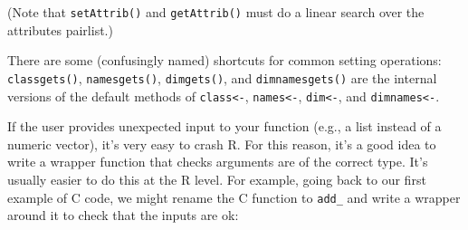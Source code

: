 \begin{Shaded}
\begin{Highlighting}[]
\StringTok{ }\NormalTok{(}\NormalTok{(} \NormalTok{, } \NormalTok{, } \NormalTok{), }

\NormalTok{)}
\StringTok{ }\NormalTok{:}
\NormalTok{, }\NormalTok{)}
\end{Highlighting}
\end{Shaded}

(Note that \texttt{setAttrib()} and \texttt{getAttrib()} must do a
linear search over the attributes pairlist.)

There are some (confusingly named) shortcuts for common setting
operations: \texttt{classgets()}, \texttt{namesgets()},
\texttt{dimgets()}, and \texttt{dimnamesgets()} are the internal
versions of the default methods of \texttt{class\textless{}-},
\texttt{names\textless{}-}, \texttt{dim\textless{}-}, and
\texttt{dimnames\textless{}-}.


If the user provides unexpected input to your function (e.g., a list
instead of a numeric vector), it's very easy to crash R. For this
reason, it's a good idea to write a wrapper function that checks
arguments are of the correct type. It's usually easier to do this at the
R level. For example, going back to our first example of C code, we
might rename the C function to \texttt{add\_} and write a wrapper around
it to check that the inputs are ok:

